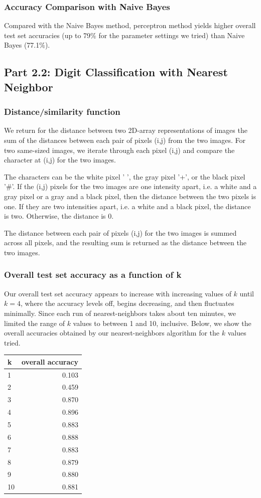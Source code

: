 \subsubsection{Accuracy Comparison with Naive Bayes}
Compared with the Naive Bayes method, perceptron method yields higher overall test set accuracies (up to 79\% for the parameter settings we tried) than Naive Bayes (77.1\%).


\subsection{Part 2.2: Digit Classification with Nearest Neighbor}
\subsubsection{Distance/similarity function}
We return for the distance between two 2D-array representations of images the sum of the distances between each pair of pixels (i,j) from the two images. For two same-sized images, we iterate through each pixel (i,j) and compare the character at (i,j) for the two images.

The characters can be the white pixel ' ', the gray pixel '+', or the black pixel '\#'. If the (i,j) pixels for the two images are one intensity apart, i.e. a white and a gray pixel or a gray and a black pixel, then the distance between the two pixels is one. If they are two intensities apart, i.e. a white and a black pixel, the distance is two. Otherwise, the distance is 0.

The distance between each pair of pixels (i,j) for the two images is summed across all pixels, and the resulting sum is returned as the distance between the two images.

\subsubsection{Overall test set accuracy as a function of k}
Our overall test set accuracy appears to increase with increasing values of $k$ until $k=4$, where the accuracy levels off, begins decreasing, and then fluctuates minimally. Since each run of nearest-neighbors takes about ten minutes, we limited the range of $k$ values to between 1 and 10, inclusive. Below, we show the overall accuracies obtained by our nearest-neighbors algorithm for the $k$ values tried.

\begin{tabular}{l|r}
k & overall accuracy \\
\hline
1 & 0.103 \\
2 & 0.459 \\
3 & 0.870 \\
4 & 0.896 \\
5 & 0.883 \\
6 & 0.888 \\
7 & 0.883 \\
8 & 0.879 \\
9 & 0.880 \\
10 & 0.881 \\
\end{tabular}


